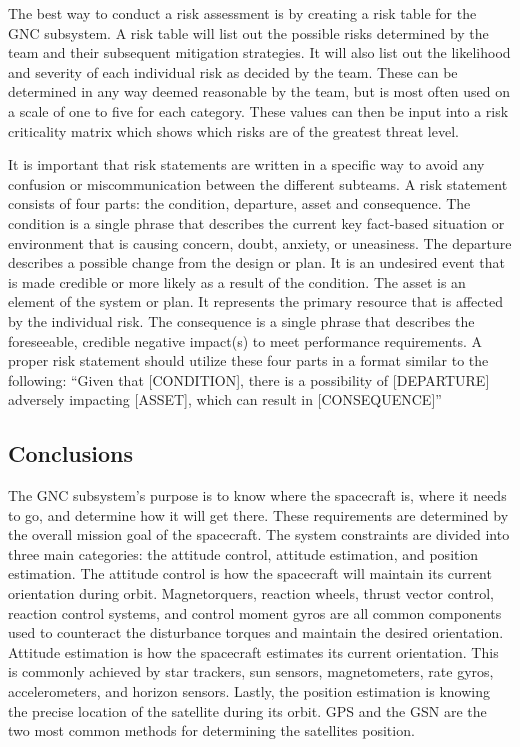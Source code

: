 \documentclass{article}
\begin{document}
The best way to conduct a risk assessment is by creating a risk table
for the GNC subsystem. A risk table will list out the possible risks
determined by the team and their subsequent mitigation strategies. It
will also list out the likelihood and severity of each individual risk
as decided by the team. These can be determined in any way deemed
reasonable by the team, but is most often used on a scale of one to
five for each category. These values can then be input into a risk
criticality matrix which shows which risks are of the greatest threat
level.  

It is important that risk statements are written in a specific way to
avoid any confusion or miscommunication between the different
subteams. A risk statement consists of four parts: the condition,
departure, asset and consequence. The condition is a single phrase
that describes the current key fact-based situation or environment
that is causing concern, doubt, anxiety, or uneasiness. The departure
describes a possible change from the design or plan. It is an
undesired event that is made credible or more likely as a result of
the condition. The asset is an element of the system or plan. It
represents the primary resource that is affected by the individual
risk. The consequence is a single phrase that describes the
foreseeable, credible negative impact(s) to meet performance
requirements. A proper risk statement should utilize these four parts
in a format similar to the following: “Given that [CONDITION], there
is a possibility of [DEPARTURE] adversely impacting [ASSET], which can
result in [CONSEQUENCE]”

\subsection{Conclusions}

The GNC subsystem's purpose is to know where the spacecraft is, where
it needs to go, and determine how it will get there. These
requirements are determined by the overall mission goal of the
spacecraft. The system constraints are divided into three main
categories: the attitude control, attitude estimation, and position
estimation. The attitude control is how the spacecraft will maintain
its current orientation during orbit. Magnetorquers, reaction wheels,
thrust vector control, reaction control systems, and control moment
gyros are all common components used to counteract the disturbance
torques and maintain the desired orientation. Attitude estimation is
how the spacecraft estimates its current orientation. This is commonly
achieved by star trackers, sun sensors, magnetometers, rate gyros,
accelerometers, and horizon sensors. Lastly, the position estimation
is knowing the precise location of the satellite during its orbit. GPS
and the GSN are the two most common methods for determining the
satellites position.  
\end{document}
